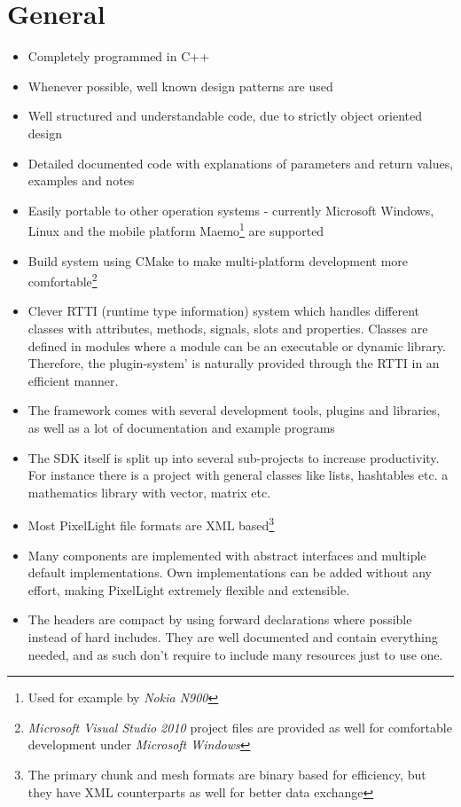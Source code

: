 \section{General}
\begin{itemize}
\item{Completely programmed in C++}
\item{Whenever possible, well known design patterns are used}
\item{Well structured and understandable code, due to strictly object oriented design}
\item{Detailed documented code with explanations of parameters and return values, examples and notes}
\item{Easily portable to other operation systems - currently Microsoft Windows, Linux and the mobile platform Maemo\footnote{Used for example by \emph{Nokia N900}} are supported}
\item{Build system using CMake to make multi-platform development more comfortable\footnote{\emph{Microsoft Visual Studio 2010} project files are provided as well for comfortable development under \emph{Microsoft Windows}}}
\item{Clever RTTI (runtime type information) system which handles different classes with attributes, methods, signals, slots and properties. Classes are defined in modules where a module can be an executable or dynamic library. Therefore, the plugin-system' is naturally provided through the RTTI in an efficient manner.}
\item{The framework comes with several development tools, plugins and libraries, as well as a lot of documentation and example programs}
\item{The SDK itself is split up into several sub-projects to increase productivity. For instance there is a project with general classes like lists, hashtables etc. a mathematics library with vector, matrix etc.}
\item{Most PixelLight file formats are XML based\footnote{The primary chunk and mesh formats are binary based for efficiency, but they have XML counterparts as well for better data exchange}}
\item{Many components are implemented with abstract interfaces and multiple default implementations. Own implementations can be added without any effort, making PixelLight extremely flexible and extensible.}
\item{The headers are compact by using forward declarations where possible instead of hard includes. They are well documented and contain everything needed, and as such don't require to include many resources just to use one.}
\end{itemize}





